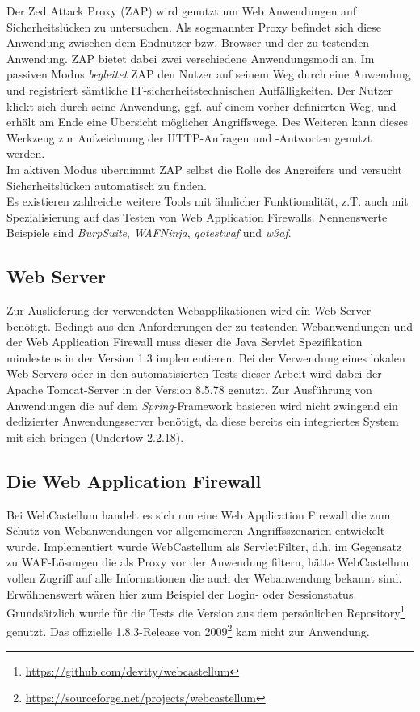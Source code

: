 Der Zed Attack Proxy (ZAP) wird genutzt um Web Anwendungen auf Sicherheitslücken zu untersuchen. Als sogenannter Proxy befindet sich diese Anwendung zwischen dem Endnutzer bzw. Browser und der zu testenden Anwendung. ZAP bietet dabei zwei verschiedene Anwendungsmodi an. Im passiven Modus \emph{begleitet} ZAP den Nutzer auf seinem Weg durch eine Anwendung und registriert sämtliche IT-sicherheitstechnischen Auffälligkeiten. Der Nutzer klickt sich durch seine Anwendung, ggf. auf einem vorher definierten Weg,  und erhält am Ende eine Übersicht möglicher Angriffswege. Des Weiteren kann dieses Werkzeug zur Aufzeichnung der HTTP-Anfragen und -Antworten genutzt werden.\\ Im aktiven Modus übernimmt ZAP selbst die Rolle des Angreifers und versucht Sicherheitslücken automatisch zu finden. \\

Es existieren zahlreiche weitere Tools mit ähnlicher Funktionalität, z.T. auch mit Spezialisierung auf das Testen von Web Application Firewalls. Nennenswerte Beispiele sind \emph{BurpSuite}, \emph{WAFNinja}, \emph{gotestwaf} und \emph{w3af}.  

\subsection{Web Server}

Zur Auslieferung der verwendeten Webapplikationen wird ein Web Server benötigt. Bedingt aus den Anforderungen der zu testenden Webanwendungen und der Web Application Firewall muss dieser die Java Servlet Spezifikation mindestens in der Version 1.3 implementieren. Bei der Verwendung eines lokalen Web Servers oder in den automatisierten Tests dieser Arbeit wird dabei der Apache Tomcat-Server in der Version 8.5.78 genutzt. Zur Ausführung von Anwendungen die auf dem \emph{Spring}-Framework basieren wird nicht zwingend ein dedizierter Anwendungsserver benötigt, da diese bereits ein integriertes System mit sich bringen (Undertow 2.2.18).

\subsection{Die Web Application Firewall}
Bei WebCastellum handelt es sich um eine Web Application Firewall die zum Schutz von Webanwendungen vor allgemeineren Angriffsszenarien entwickelt wurde. Implementiert wurde WebCastellum als ServletFilter, d.h. im Gegensatz zu WAF-Lösungen die als Proxy vor der Anwendung filtern, hätte WebCastellum vollen Zugriff auf alle Informationen die auch der Webanwendung bekannt sind. Erwähnenswert wären hier zum Beispiel der Login- oder Sessionstatus. Grundsätzlich wurde für die Tests die Version aus dem persönlichen Repository\footnote{\url{https://github.com/devtty/webcastellum}} genutzt. Das offizielle 1.8.3-Release von 2009\footnote{\url{https://sourceforge.net/projects/webcastellum}} kam nicht zur Anwendung.


